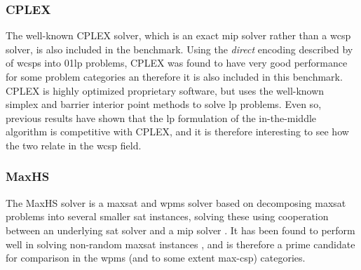 \subsubsection{CPLEX}
The well-known CPLEX solver, which is an exact \gls{mip} solver rather than a \gls{wcsp} solver, is also included in the benchmark.
Using the \emph{direct} encoding described by \textcite[\pno~3]{deGivry14} of \glspl{wcsp} into \gls{01lp} problems, CPLEX was found to have very good performance for some problem categories an therefore it is also included in this benchmark.
CPLEX is highly optimized proprietary software, but uses the well-known simplex and barrier interior point methods to solve \gls{lp} problems.
Even so, previous results \parencite{Mason01,Ernst05} have shown that the \gls{lp} formulation of the in-the-middle algorithm is competitive with CPLEX, and it is therefore interesting to see how the two relate in the \gls{wcsp} field.

\subsubsection{MaxHS}
The MaxHS solver is a \gls{maxsat} and \gls{wpms} solver based on decomposing \gls{maxsat} problems into several smaller \gls{sat} instances, solving these using cooperation between an underlying \gls{sat} solver and a \gls{mip} solver \parencite{Davies11}.
It has been found to perform well in solving non-random \gls{maxsat} instances \parencite{Davies13}, and is therefore a prime candidate for comparison in the \gls{wpms} (and to some extent max-\gls{csp}) categories.
